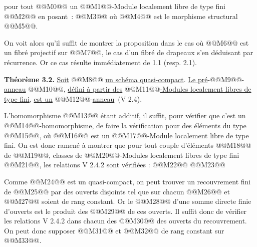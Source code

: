 
pour tout @@M0@@ un @@M1@@-Module localement libre de type fini @@M2@@ en posant~:
@@M3@@
où @@M4@@ est le morphisme structural @@M5@@.

On voit alors qu'il suffit de montrer la proposition dans le cas où @@M6@@ est un fibré projectif sur @@M7@@, le cas d'un fibré de drapeaux s'en déduisant par récurrence. Or ce cas résulte immédiatement de 1.1 (resp. 2.1).

\textbf{Théorème 3.2.} \uline{Soit} @@M8@@ \uline{un schéma quasi-compact}. \uline{Le pré}-@@M9@@-\uline{anneau} @@M10@@, \uline{défini à partir des} @@M11@@\uline{-Modules localement libres de type fini}, \uline{est un} @@M12@@-\uline{anneau}~(V 2.4).

L'homomorphisme @@M13@@ étant additif, il suffit, pour vérifier que c'est un @@M14@@-homomorphisme, de faire la vérification pour des éléments du type @@M15@@, où @@M16@@ est un @@M17@@-Module localement libre de type fini. On est donc ramené à montrer que pour tout couple d'éléments @@M18@@ de @@M19@@, classes de @@M20@@-Modules localement libres de type fini @@M21@@, les relations V 2.4.2 sont vérifiées :
@@M22@@
@@M23@@

Comme @@M24@@ est un quasi-compact, on peut trouver un recouvrement fini de @@M25@@ par des ouverts disjoints tel que sur chacun @@M26@@ et @@M27@@ soient de rang constant. Or le @@M28@@ d'une somme directe finie d'ouverts est le produit des @@M29@@ de ces ouverts. Il suffit donc de vérifier les relations V 2.4.2 dans chacun des @@M30@@ des ouverts du recouvrement. On peut donc supposer @@M31@@ et @@M32@@ de rang constant sur @@M33@@.

